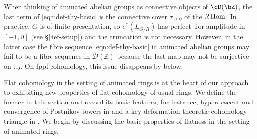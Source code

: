 \brem \label{rem-proj-amp}
When thinking of animated abelian groups as connective objects of $\cD(\bZ)$, the last term of \eqref{eqn:def-thy-basic} is the connective cover $\tau_{\geq 0}$ of the $R\operatorname{Hom}$. In practice, $G$ is of finite presentation, so $e^*(L_{G/R})$ has perfect Tor-amplitude in $[-1,0]$ (see \S\ref{def-setup}) and the truncation is not necessary. However, in the latter case the fibre sequence \eqref{eqn:def-thy-basic} in animated abelian groups may fail to be a fibre sequence in $\mathcal D(\mathbb Z)$ because the last map may not be surjective on $\pi_0$. On fppf cohomology, this issue disappears by  below.
\erem





















 \label{sec:fppf-coho-simplicial}


Flat cohomology in the setting of animated rings is at the heart of our approach to exhibiting new properties of flat cohomology of usual rings. We define the former in this section and record its basic features, for instance, hyperdescent and convergence of Postnikov towers in  and a key deformation-theoretic cohomology triangle in . We begin by discussing the basic properties of flatness in the setting of animated rings. %

